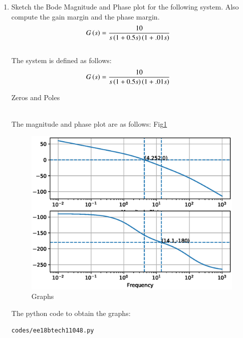  
\begin{enumerate}[label=\thesection.\arabic*.,ref=\thesection.\theenumi]

\item Sketch the Bode Magnitude and Phase plot for the following system. Also compute the gain margin and the phase margin.
\begin{align}
G\left(s\right) &= \frac{10}{s\left(1+0.5s\right)\left(1+.01s\right)}
\label{eq:ee18btech11048_2}
\end{align}
\\
\solution 
The system is defined as follows:
\begin{align}
G\left(s\right) &= \frac{10}{s\left(1+0.5s\right)\left(1+.01s\right)}
\end{align}
\begin{table}[!ht]
\centering

\caption{Zeros and Poles}
\label{table:ee18btech11048}
\end{table}\\
The magnitude and phase plot are as follows: Fig\ref{fig:ee18btech11048} 
\begin{figure}[!h]
\centering
  \includegraphics[width=\columnwidth]{./figs/ee18btech11048.eps}
  \caption{Graphs}
  \label{fig:ee18btech11048}
\end{figure}

The python code to obtain the graphs:

\begin{lstlisting}
codes/ee18btech11048.py
\end{lstlisting}


\end{enumerate}
